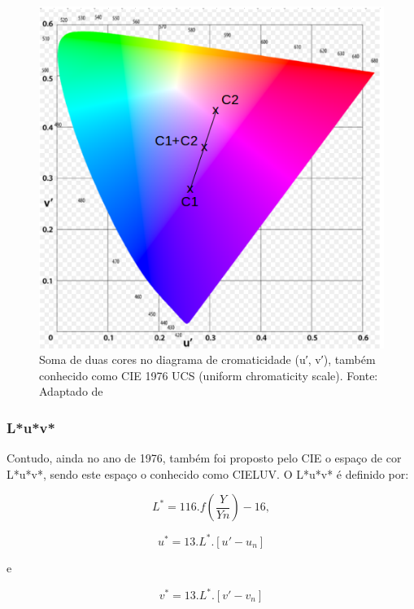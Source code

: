 \documentclass[a4paper,10pt]{report}
\begin{document}
\begin{figure}[!htb]
     \centering
     \includegraphics[scale=0.7]{img/luv_linearity.png}
     \caption{Soma de duas cores no diagrama de cromaticidade (u′, v′), também
conhecido como CIE 1976 UCS (uniform chromaticity scale). Fonte: Adaptado de
}
     \label{fig:cie_1976_luv}
\end{figure}

\subsubsection{L*u*v*}
\par
Contudo, ainda no ano de 1976, também foi proposto pelo CIE o espaço de cor
L*u*v*, sendo este espaço o conhecido como CIELUV. O L*u*v* é definido por:

\begin{equation}\label{eq:L*u*v*_L*}
L^*=116.f(\frac{Y}{Yn})-16,
\end{equation}

\begin{equation}\label{eq:L*u*v*_u*}
u^*=13.L^*.[u'-u_n]
\end{equation}

e

\begin{equation}\label{eq:L*u*v*_v*}
v^*=13.L^*.[v'-v_n]
\end{equation}
\end{document}
